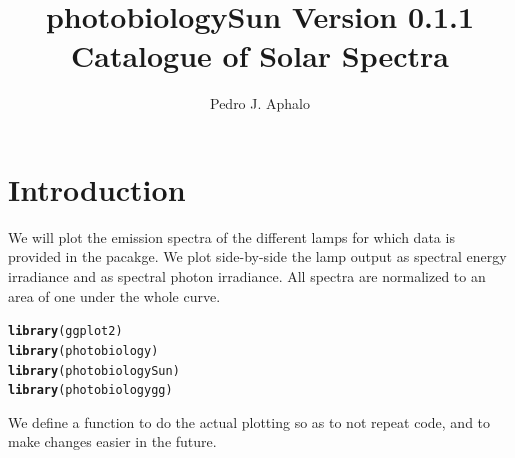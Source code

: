 \documentclass{article}\usepackage[]{graphicx}\usepackage[]{color}
\makeatletter
\newcommand{\hlstd}[1]{\textcolor[rgb]{0.345,0.345,0.345}{#1}}%
\newcommand{\hlkwd}[1]{\textcolor[rgb]{0.737,0.353,0.396}{\textbf{#1}}}%
\newenvironment{kframe}{%
 \def\at@end@of@kframe{}%
 \ifinner\ifhmode%
  \def\at@end@of@kframe{\end{minipage}}%
  \begin{minipage}{\columnwidth}%
 \fi\fi%
 \def\FrameCommand##1{\hskip\@totalleftmargin \hskip-\fboxsep
 \colorbox{shadecolor}{##1}\hskip-\fboxsep
     \hskip-\linewidth \hskip-\@totalleftmargin \hskip\columnwidth}%
 \MakeFramed {\advance\hsize-\width
   \@totalleftmargin\z@ \linewidth\hsize
   \@setminipage}}%
 {\par\unskip\endMakeFramed%
 \at@end@of@kframe}
\newenvironment{knitrout}{}{} %
\newcommand{\PBSun}{\textsf{photobiologySun}\xspace}
\makeatother
\begin{document}
\title{\PBSun Version 0.1.1\\ Catalogue of Solar Spectra}
\author{Pedro J. Aphalo}

\maketitle

\section{Introduction}

We will plot the emission spectra of the different lamps for which data is provided in the pacakge. We plot side-by-side the lamp output as spectral energy irradiance and as spectral photon irradiance. All spectra are normalized to an area of one under the whole curve.




\begin{knitrout}\footnotesize
{}\color{fgcolor}\begin{kframe}
\begin{alltt}
\hlkwd{library}\hlstd{(ggplot2)}
\hlkwd{library}\hlstd{(photobiology)}
\hlkwd{library}\hlstd{(photobiologySun)}
\hlkwd{library}\hlstd{(photobiologygg)}
\end{alltt}


{\ttfamily\noindent\itshape\color{messagecolor}{\#\# Loading required package: proto\\\#\# Loading required package: splus2R\\\#\# Loading required package: plyr}}\end{kframe}
\end{knitrout}


We define a function to do the actual plotting so as to not repeat code, and to make changes easier in the future.
\end{document}

